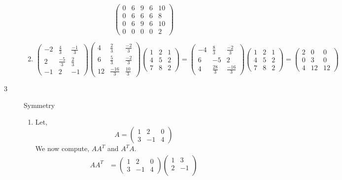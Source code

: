 \documentclass[letterpaper,10pt]{article}
\begin{document}
\begin{description}
\begin{enumerate}[label=\alph*.]
\[\begin{pmatrix}
0 & 6 & 9 & 6 & 10\\
0 & 6 & 6 & 6 & 8\\
0 & 6 & 9 & 6 & 10\\
0 & 0 & 0 & 0 & 2
\end{pmatrix}
\]
\item
\[\begin{pmatrix}
-2 & \frac{4}{3} & \frac{-1}{3}\\
2 & \frac{-5}{3} & \frac{2}{3}\\
-1 & 2 &-1
\end{pmatrix}\begin{pmatrix}
4 & \frac{2}{3} & \frac{-2}{3}\\
6 & \frac{5}{3} & \frac{-2}{3}\\
12 & \frac{-16}{3} & \frac{10}{3}
\end{pmatrix}\begin{pmatrix}
1 & 2 & 1\\
4 & 5 & 2\\
7 & 8 & 2
\end{pmatrix}=\begin{pmatrix}
-4 & \frac{8}{3} & \frac{-2}{3}\\
6 & -5 & 2\\
4 & \frac{28}{3} & \frac{-16}{3}
\end{pmatrix}\begin{pmatrix}
1 & 2 & 1\\
4 & 5 & 2\\
7 & 8 & 2
\end{pmatrix}=\begin{pmatrix}
2 & 0 & 0\\
0 & 3 & 0\\
4 & 12 & 12
\end{pmatrix}
\]
\end{enumerate}
\item[3] Symmetry
\begin{enumerate}[label=\alph*.]
\item Let,
\[A=\begin{pmatrix}
1 & 2 & 0\\
3 & -1 & 4
\end{pmatrix}\]
We now compute, $AA^T$ and $A^TA$.
\begin{align*}
AA^T &= \begin{pmatrix}
1 & 2 & 0\\
3 & -1 & 4
\end{pmatrix}\begin{pmatrix}
1 & 3\\
2 & -1\\

\end{pmatrix}
\end{align*}
\end{enumerate}
\end{description}
\end{document}
